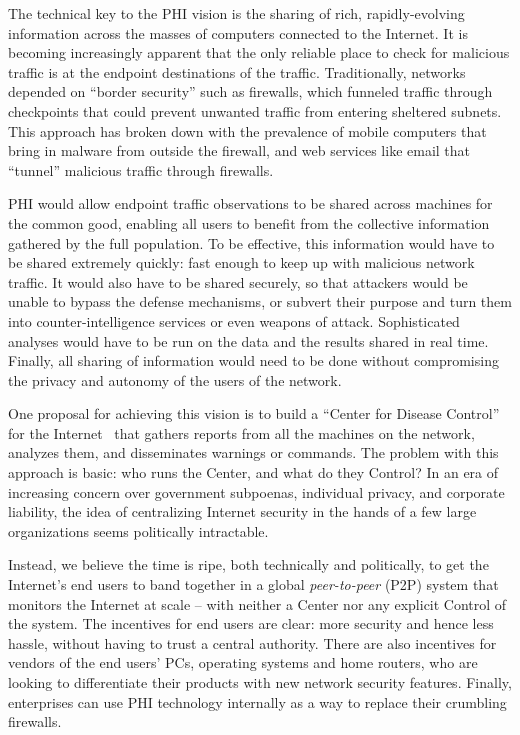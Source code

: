 \documentclass{acm_proc_article-sp}
\begin{document}
The technical key to the PHI vision is the sharing of rich, rapidly-evolving information across the masses of computers connected to the Internet. It is becoming increasingly apparent that the only reliable place to check for malicious traffic is at the endpoint destinations of the traffic. Traditionally, networks depended on ``border security'' such as firewalls, which funneled traffic through checkpoints that could prevent unwanted traffic from entering sheltered subnets. This approach has broken down with the prevalence of mobile computers that bring in malware from outside the firewall, and web services like email that ``tunnel'' malicious traffic through firewalls.

PHI would allow endpoint traffic observations to be shared across machines for the common good, enabling all users to benefit from the collective information gathered by the full population. To be effective, this information would have to be shared extremely quickly: fast enough to keep up with malicious network traffic. It would also have to be shared securely, so that attackers would be unable to bypass the defense mechanisms, or subvert their purpose and turn them into counter-intelligence services or even weapons of attack. Sophisticated analyses would have to be run on the data and the results shared in real time. Finally, all sharing of information would need to be done without compromising the privacy and autonomy of the users of the network.

One proposal for achieving this vision is to build a ``Center for Disease Control'' for the Internet~\cite{sparetime} that gathers reports from all the machines on the network, analyzes them, and disseminates warnings or commands. The problem with this approach is basic: who runs the Center, and what do they Control? In an era of increasing concern over government subpoenas, individual privacy, and corporate liability, the idea of centralizing Internet security in the hands of a few large organizations seems politically intractable.

Instead, we believe the time is ripe, both technically and politically,
to get the Internet's end users to band together in a global {\em
  peer-to-peer} (P2P) system that monitors the Internet at scale -- with
neither a Center nor any explicit Control of the system. The incentives
for end users are clear: more security and hence less hassle, without
having to trust a central authority. There are also incentives for
vendors of the end users' PCs, operating systems and home routers, who are looking to differentiate their products with new network security features. Finally, enterprises can use PHI technology internally as a way to replace their crumbling firewalls.
\end{document}
